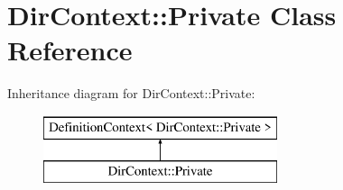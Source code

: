 \hypertarget{class_dir_context_1_1_private}{}\section{Dir\+Context\+::Private Class Reference}
\label{class_dir_context_1_1_private}
Inheritance diagram for Dir\+Context\+::Private\+:\begin{figure}[H]
\begin{center}
\leavevmode
\includegraphics[height=2.000000cm]{class_dir_context_1_1_private}
\end{center}
\end{figure}
